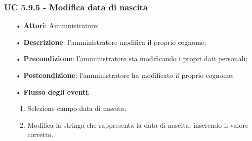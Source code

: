 \subsubsection{UC 5.9.5 - Modifica data di nascita}
\begin{itemize}
	\item[•]\textbf{Attori}: Amministratore;
	\item[•]\textbf{Descrizione}: l'amministratore modifica il proprio cognome;
	\item[•]\textbf{Precondizione}: l'amministratore sta modificando i propri dati personali;
	\item[•]\textbf{Postcondizione}: l'amministratore ha modificato il proprio cognome; 
	\item[•]\textbf{Flusso degli eventi}: 
	\begin{enumerate}
		\item Selezione campo data di nascita;
		\item Modifica la stringa che rappresenta la data di nascita, inserendo il valore corretto.
	\end{enumerate}
\end{itemize}
